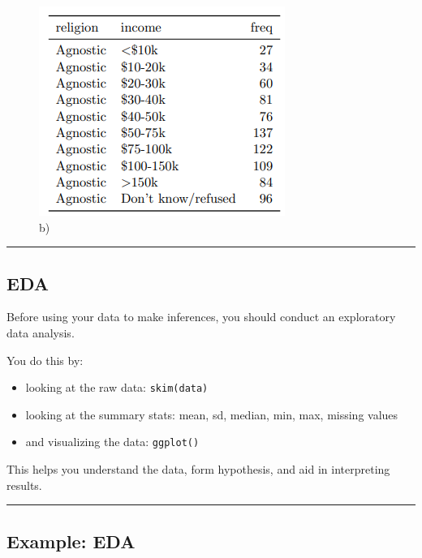 \documentclass[
  letterpaper,
  DIV=11,
  numbers=noendperiod]{scrreprt}
\providecommand{\tightlist}{%
  \setlength{\itemsep}{0pt}\setlength{\parskip}{0pt}}\usepackage{longtable,booktabs,array}
\begin{document}
\begin{figure}

{\centering \includegraphics{images/images_lecture/tidy6.PNG}

}

\caption{b)}

\end{figure}

\begin{center}\rule{0.5\linewidth}{0.5pt}\end{center}

\hypertarget{eda}{%
\subsection*{EDA}\label{eda}}

Before using your data to make inferences, you should conduct an
exploratory data analysis.

You do this by:

\begin{itemize}
\tightlist
\item
  looking at the raw data: \texttt{skim(data)}
\item
  looking at the summary stats: mean, sd, median, min, max, missing
  values
\item
  and visualizing the data: \texttt{ggplot()}
\end{itemize}

This helps you understand the data, form hypothesis, and aid in
interpreting results.

\begin{center}\rule{0.5\linewidth}{0.5pt}\end{center}

\hypertarget{example-eda}{%
\subsection*{Example: EDA}\label{example-eda}}
\end{document}
